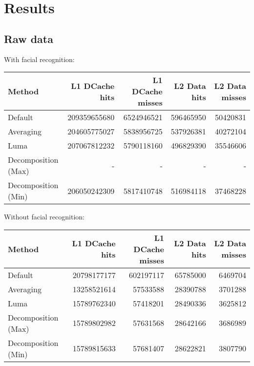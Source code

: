 \documentclass[a4paper]{article}
\begin{document}
\section{Results}
\subsection{Raw data}

With facial recognition:
\begin{center}
\begin{tabular}{ |l||r|r|r|r| }
\hline
Method & L1 DCache hits & L1 DCache misses & L2 Data hits & L2 Data misses  \\
\hline\hline
Default & 209359655680 & 6524946521 & 596465950 & 50420831 \\
\hline
Averaging & 204605775027 & 5838956725 & 537926381 & 40272104 \\
\hline
Luma & 207067812232 & 5790118160 & 496829390 & 35546606 \\
\hline
Decomposition (Max)\footnotemark & - & - & - & - \\
\hline
Decomposition (Min) & 206050242309 & 5817410748 & 516984118 & 37468228 \\
\hline
\end{tabular}
\end{center}

Without facial recognition:
\begin{center}
\begin{tabular}{ |l||r|r|r|r| }
\hline
Method & L1 DCache hits & L1 DCache misses & L2 Data hits & L2 Data misses  \\
\hline\hline
Default & 20798177177 & 602197117 & 65785000 &  6469704 \\
\hline
Averaging & 13258521614 & 57533588 & 28390788 & 3701288 \\
\hline
Luma & 15789762340 & 57418201 & 28490336 &  3625812\\
\hline
Decomposition (Max) & 15789802982 & 57631568 & 28642166 & 3686989 \\
\hline
Decomposition (Min) & 15789815633 & 57681407 & 28622821 & 3807790 \\
\hline
\end{tabular}
\end{center}

\end{document}
